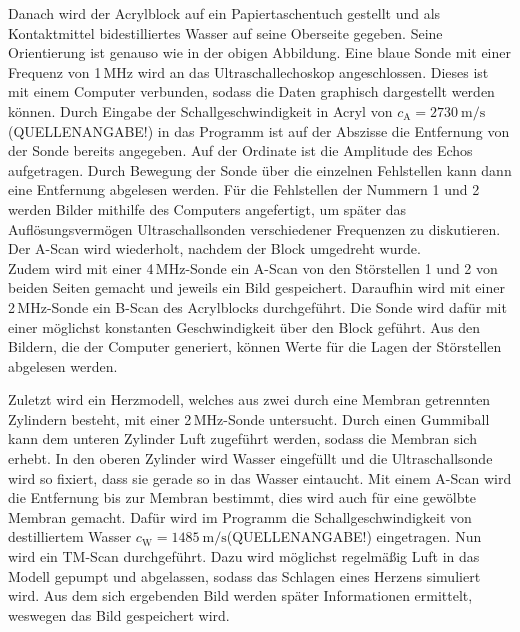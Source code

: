Danach wird der Acrylblock auf ein Papiertaschentuch gestellt und als Kontaktmittel
bidestilliertes Wasser auf seine Oberseite gegeben. Seine Orientierung ist genauso wie in
der obigen Abbildung. Eine blaue Sonde mit einer Frequenz von 1\,MHz wird an das
Ultraschallechoskop angeschlossen. Dieses ist mit einem Computer verbunden, sodass
die Daten graphisch dargestellt werden können. Durch Eingabe der Schallgeschwindigkeit
in Acryl von $c_\text{A} = \SI{2730}{\meter\per\second}$(QUELLENANGABE!) in das Programm ist auf der Abszisse die
Entfernung von der Sonde bereits angegeben. Auf der Ordinate ist die Amplitude des Echos
aufgetragen. Durch Bewegung der Sonde über die einzelnen Fehlstellen kann dann eine
Entfernung abgelesen werden. Für die Fehlstellen der Nummern 1 und 2 werden Bilder mithilfe
des Computers angefertigt, um später das Auflösungsvermögen Ultraschallsonden verschiedener
Frequenzen zu diskutieren. Der A-Scan wird wiederholt, nachdem der Block umgedreht wurde.\\
Zudem wird mit einer 4\,MHz-Sonde ein A-Scan von den Störstellen 1 und 2 von beiden Seiten
gemacht und jeweils ein Bild gespeichert.
Daraufhin wird mit einer 2\,MHz-Sonde ein B-Scan des Acrylblocks durchgeführt. Die Sonde wird dafür mit einer
möglichst konstanten Geschwindigkeit über den Block geführt. Aus den Bildern, die
der Computer generiert, können Werte für die Lagen der Störstellen abgelesen werden.

Zuletzt wird ein Herzmodell, welches aus zwei durch eine Membran getrennten Zylindern
besteht, mit einer 2\,MHz-Sonde untersucht. Durch einen Gummiball kann dem unteren Zylinder Luft zugeführt werden, sodass die Membran
sich erhebt. In den oberen Zylinder wird Wasser eingefüllt und die Ultraschallsonde
wird so fixiert, dass sie gerade so in das Wasser eintaucht. Mit einem A-Scan wird die
Entfernung bis zur Membran bestimmt, dies wird auch für eine gewölbte Membran gemacht.
Dafür wird im Programm die Schallgeschwindigkeit von destilliertem Wasser
$c_\text{W}=\SI{1485}{\meter\per\second}$(QUELLENANGABE!) eingetragen.
Nun wird ein TM-Scan durchgeführt. Dazu wird möglichst regelmäßig Luft in das Modell
gepumpt und abgelassen, sodass das Schlagen eines Herzens simuliert wird. Aus dem
sich ergebenden Bild werden später Informationen ermittelt, weswegen das Bild gespeichert wird.
